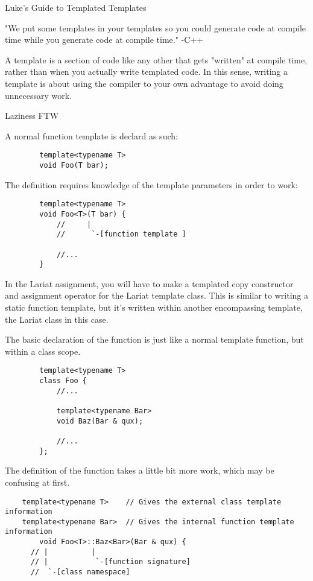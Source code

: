 \begin{section}{Luke's Guide to Templated Templates}

 \begin{displayquote}
	 "We put some templates in your templates so you could generate code at compile
	 time while you generate code at compile time."
	 -C++
 \end{displayquote}

 \indent A template is a section of code like any other that gets "written" at compile
 time, rather than when you actually write templated code. In this sense,
 writing a template is about using the compiler to your own advantage to avoid
 doing unnecessary work.

 \begin{displayquote}
	 Laziness FTW
 \end{displayquote}


 A normal function template is declard as such:
 \begin{verbatim}
		template<typename T>
		void Foo(T bar);
	\end{verbatim}

 The definition requires knowledge of the template parameters in order to work:

 \begin{verbatim}
		template<typename T>
		void Foo<T>(T bar) {
			//     |
			//      `-[function template ]

			//...
		}
	\end{verbatim}

 \indent In the Lariat assignment, you will have to make a templated copy constructor
 and assignment operator for the Lariat template class. This is similar to
 writing a static function template, but it's written within another
 encompassing template, the Lariat class in this case.

 \indent The basic declaration of the function is just like a normal template
 function, but within a class scope.

 \begin{verbatim}
		template<typename T>
		class Foo {
			//...

			template<typename Bar>
			void Baz(Bar & qux);

			//...
		};
	\end{verbatim}

 \indent The definition of the function takes a little bit more work, which may be confusing at first.


 \begin{verbatim}
    template<typename T>    // Gives the external class template information
    template<typename Bar>  // Gives the internal function template information
		void Foo<T>::Baz<Bar>(Bar & qux) {
      // |          |
      // |           `-[function signature]
      //  `-[class namespace]


\end{verbatim}
\end{section}

